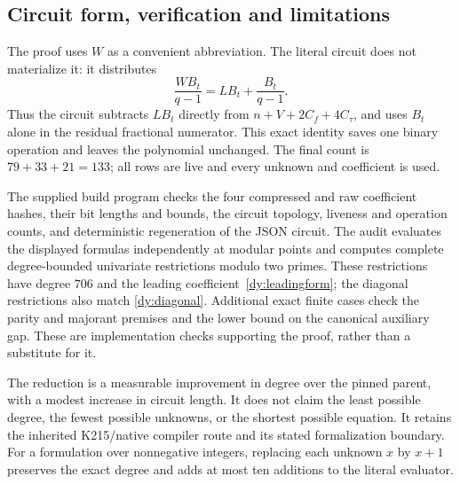 \subsection{Circuit form, verification and limitations}
\label{dy:verification}

The proof uses $W$ as a convenient abbreviation.  The literal circuit
does not materialize it: it distributes
\begin{equation}
 \frac{WB_t}{q-1}=LB_t+\frac{B_t}{q-1}.
 \label{dy:weightsave}
\end{equation}
Thus the circuit subtracts $LB_t$ directly from
$n+V+2C_f+4C_\tau$, and uses $B_t$ alone in the residual fractional
numerator.  This exact identity saves one binary operation and leaves the
polynomial unchanged.  The final count is $79+33+21=133$; all rows are
live and every unknown and coefficient is used.

The supplied build program checks the four compressed and raw coefficient
hashes, their bit lengths and bounds, the circuit topology, liveness and
operation counts, and deterministic regeneration of the JSON circuit.
The audit evaluates the displayed formulas independently at modular
points and computes complete degree-bounded univariate restrictions
modulo two primes.  These restrictions have degree $706$ and the leading
coefficient~\eqref{dy:leadingform}; the diagonal restrictions also match
\eqref{dy:diagonal}.  Additional exact finite cases check the parity and
majorant premises and the lower bound on the canonical auxiliary gap.
These are implementation checks supporting the proof, rather than a
substitute for it.

The reduction is a measurable improvement in degree over the pinned
parent, with a modest increase in circuit length.  It does not claim the
least possible degree, the fewest possible unknowns, or the shortest
possible equation.  It retains the inherited K215/native compiler route
and its stated formalization boundary.  For a formulation over
nonnegative integers, replacing each unknown $x$ by $x+1$ preserves the
exact degree and adds at most ten additions to the literal evaluator.
